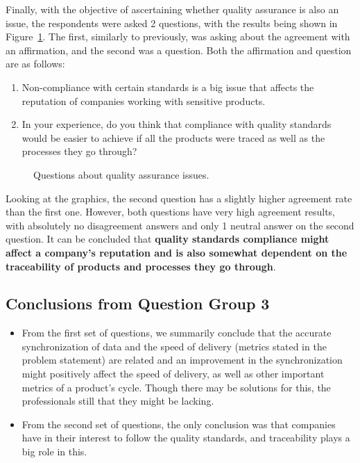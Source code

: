 Finally, with the objective of ascertaining whether quality assurance is also an issue, the respondents were asked 2 questions, with the results being shown in Figure~\ref{fig:group3_quality}. The first, similarly to previously, was asking about the agreement with an affirmation, and the second was a question.  Both the affirmation and question are as follows:

\begin{enumerate}
  \item Non-compliance with certain standards is a big issue that affects the reputation of companies working with sensitive products.
  \item In your experience, do you think that compliance with quality standards would be easier to achieve if all the products were traced as well as the processes they go through?
\end{enumerate}

\pagebreak

\begin{figure}[h]

    \caption{Questions about quality assurance issues.}
  \label{fig:group3_quality}
\end{figure}

Looking at the graphics, the second question has a slightly higher agreement rate than the first one. However, both questions have very high agreement results, with absolutely no disagreement answers and only 1 neutral answer on the second question. It can be concluded that \textbf{quality standards compliance might affect a company's reputation and is also somewhat dependent on the traceability of products and processes they go through}.


\subsection*{Conclusions from Question Group 3}

\begin{itemize}
  \item From the first set of questions, we summarily conclude that the accurate synchronization of data and the speed of delivery (metrics stated in the problem statement) are related and an improvement in the synchronization might positively affect the speed of delivery, as well as other important metrics of a product's cycle. Though there may be solutions for this, the professionals still that they might be lacking.

  \item From the second set of questions, the only conclusion was that companies have in their interest to follow the quality standards, and traceability plays a big role in this.
\end{itemize}

